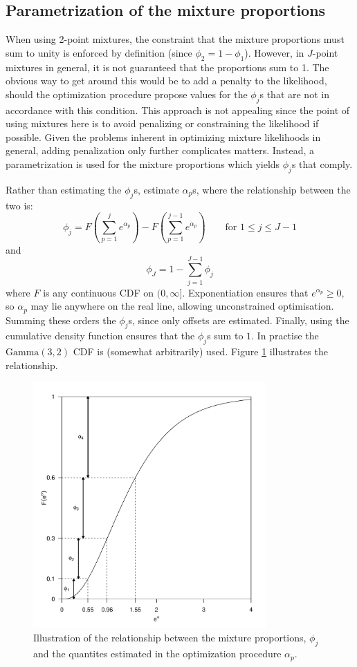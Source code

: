 \subsection{Parametrization of the mixture proportions}
\label{ds-mixpar}

When using 2-point mixtures, the constraint that the mixture proportions must sum to unity is enforced by definition (since $\phi_2=1-\phi_1$). However, in $J$-point mixtures in general, it is not guaranteed that the proportions sum to 1. The obvious way to get around this would be to add a penalty to the likelihood, should the optimization procedure propose values for the $\phi_j$s that are not in accordance with this condition. This approach is not appealing since the point of using mixtures here is to avoid penalizing or constraining the likelihood if possible. Given the problems inherent in optimizing mixture likelihoods in general, adding penalization only further complicates matters. Instead, a parametrization is used for the mixture proportions which yields $\phi_j$s that comply.

Rather than estimating the $\phi_j$s, estimate $\alpha_p$s, where the relationship between the two is:
\begin{equation*}
\phi_j = F(\sum_{p=1}^j e^{\alpha_p}) - F(\sum_{p=1}^{j-1} e^{\alpha_p}) \qquad \text{for } 1\leq j \leq J-1
\end{equation*}
and
\begin{equation*}
\phi_J = 1-\sum_{j=1}^{J-1} \phi_j
\end{equation*}
where $F$ is any continuous CDF on $(0,\infty]$. Exponentiation ensures that $e^{\alpha_p}\geq0$, so $\alpha_p$ may lie anywhere on the real line, allowing unconstrained optimisation. Summing these orders the $\phi_j$s, since only offsets are estimated. Finally, using the cumulative density function ensures that the $\phi_j$s sum to $1$. In practise the $\text{Gamma}(3,2)$ CDF is (somewhat arbitrarily) used. Figure \ref{mmds-phifig} illustrates the relationship.

\begin{figure}
\centering
\includegraphics[width=3.5in]{mix/figs/phidia.pdf}
\caption{Illustration of the relationship between the mixture proportions, $\phi_j$ and the quantites estimated in the optimization procedure $\alpha_p$.}
\label{mmds-phifig}
\end{figure}

